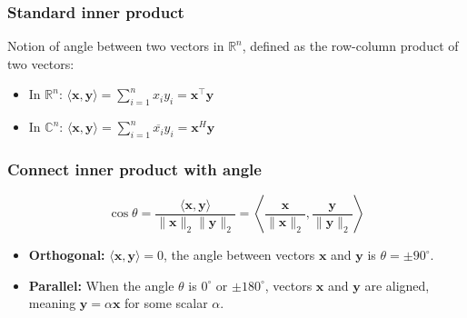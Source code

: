 \documentclass{article}
\begin{document}
        \subsubsection{Standard inner product}
        \begin{definition}
            Notion of angle between two vectors in $\mathbb{R}^n$, defined as the row-column product of two vectors:
            \begin{itemize}
                \item In \( \mathbb{R}^n \): $\langle \mathbf{x}, \mathbf{y} \rangle = \sum_{i=1}^{n} x_i y_i = \mathbf{x}^\top \mathbf{y}$
                \item In \( \mathbb{C}^n \): $\langle \mathbf{x}, \mathbf{y} \rangle = \sum_{i=1}^{n} \overline{x_i} y_i = \mathbf{x}^H \mathbf{y}$
            \end{itemize}
        \end{definition}

        \subsubsection{Connect inner product with angle}
            \begin{definition}
                \begin{equation}
                    \cos\theta = \frac{\langle \mathbf{x}, \mathbf{y} \rangle}{\|\mathbf{x}\|_2 \|\mathbf{y}\|_2} = \left\langle \frac{\mathbf{x}}{\|\mathbf{x}\|_2}, \frac{\mathbf{y}}{\|\mathbf{y}\|_2} \right\rangle
                \end{equation}
                \begin{itemize}
                    \item \textbf{Orthogonal:} \( \langle \mathbf{x}, \mathbf{y} \rangle = 0 \), the angle between vectors \( \mathbf{x} \) and \( \mathbf{y} \) is \( \theta = \pm 90^\circ \).
                    \item \textbf{Parallel:} When the angle \( \theta \) is \( 0^\circ \) or \( \pm 180^\circ \), vectors \( \mathbf{x} \) and \( \mathbf{y} \) are aligned, meaning \( \mathbf{y} = \alpha \mathbf{x} \) for some scalar \( \alpha \).
                \end{itemize}
            \end{definition}
        
\end{document}
